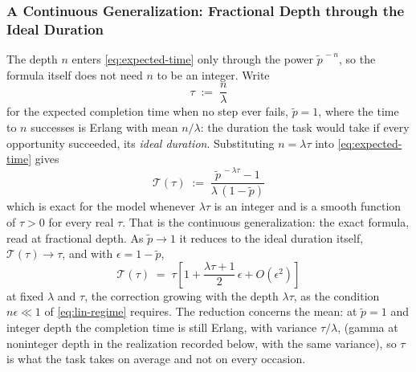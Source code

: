 \documentclass{article}
\begin{document}
\subsubsection{A Continuous Generalization: Fractional Depth through the Ideal Duration}\label{sssec:continuous}
The depth $n$ enters \eqref{eq:expected-time} only through the power $\widetilde{p}^{\,-n}$, so the formula itself does not need $n$ to be an integer. Write
\begin{equation}\label{eq:ideal-duration}
\tau \;:=\; \frac{n}{\lambda}
\end{equation}
for the expected completion time when no step ever fails, $\widetilde{p} = 1$, where the time to $n$ successes is Erlang with mean $n/\lambda$: the duration the task would take if every opportunity succeeded, its \emph{ideal duration}. Substituting $n = \lambda\tau$ into \eqref{eq:expected-time} gives
\begin{equation}\label{eq:continuous}
\boxed{\;\mathcal{T}(\tau) \;:=\; \frac{\widetilde{p}^{\,-\lambda\tau} - 1}{\lambda\,(1 - \widetilde{p})}\;}
\end{equation}
which is exact for the model whenever $\lambda\tau$ is an integer and is a smooth function of $\tau > 0$ for every real $\tau$. That is the continuous generalization: the exact formula, read at fractional depth. As $\widetilde{p} \to 1$ it reduces to the ideal duration itself, $\mathcal{T}(\tau) \to \tau$, and with $\epsilon = 1 - \widetilde{p}$,
\begin{equation}\label{eq:continuous-expansion}
\mathcal{T}(\tau) \;=\; \tau\left[1 + \frac{\lambda\tau + 1}{2}\,\epsilon + O(\epsilon^{2})\right]
\end{equation}
at fixed $\lambda$ and $\tau$, the correction growing with the depth $\lambda\tau$, as the condition $n\epsilon \ll 1$ of \eqref{eq:lin-regime} requires. The reduction concerns the mean: at $\widetilde{p} = 1$ and integer depth the completion time is still Erlang, with variance $\tau/\lambda$, (gamma at noninteger depth in the realization recorded below, with the same variance), so $\tau$ is what the task takes on average and not on every occasion.
\end{document}

